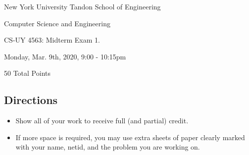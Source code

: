 \documentclass[10pt]{article}
\begin{document}
	
\begin{center}
	\normalsize
	New York University Tandon School of Engineering
	
	Computer Science and Engineering
	\medskip
	
	\large
	CS-UY 4563: Midterm Exam 1. 
	
	Monday, Mar. 9th, 2020, 9:00 - 10:15pm
	
	50 Total Points
	\medskip
\end{center} 

\subsection{Directions}
\begin{itemize}
	\item Show all of your work to receive full (and partial) credit.
	\item If more space is required, you may use extra sheets of paper clearly marked with your name, netid, and the problem you are working on.
\end{itemize}
\end{document}
